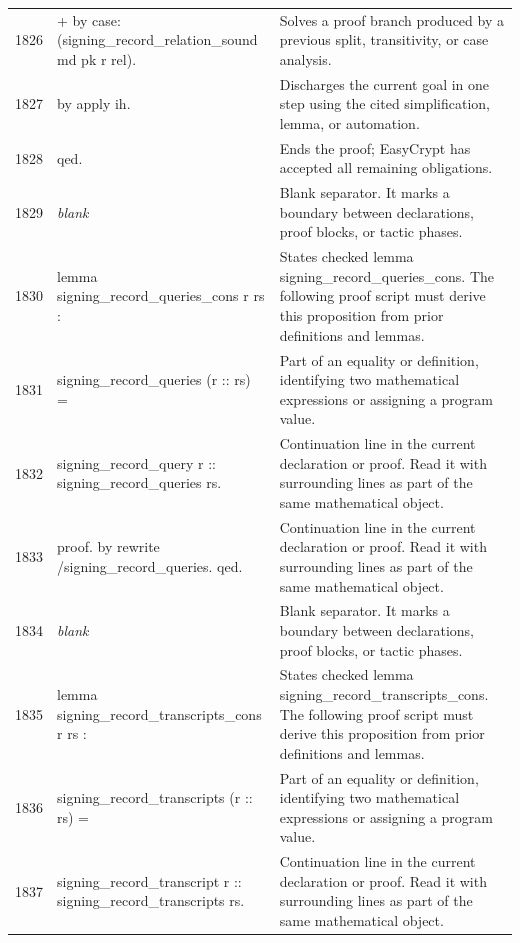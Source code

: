 \documentclass[10pt]{article}
\begin{document}
\begin{longtable}{r L{0.53\textwidth} L{0.37\textwidth}}
1826 & {\ttfamily\scriptsize + by case: (signing\_record\_relation\_sound md pk r rel).} & Solves a proof branch produced by a previous split, transitivity, or case analysis. \\
1827 & {\ttfamily\scriptsize by apply ih.} & Discharges the current goal in one step using the cited simplification, lemma, or automation. \\
1828 & {\ttfamily\scriptsize qed.} & Ends the proof; EasyCrypt has accepted all remaining obligations. \\
1829 & {\ttfamily\scriptsize \emph{blank}} & Blank separator.  It marks a boundary between declarations, proof blocks, or tactic phases. \\
1830 & {\ttfamily\scriptsize lemma signing\_record\_queries\_cons r rs :} & States checked lemma signing\_record\_queries\_cons.  The following proof script must derive this proposition from prior definitions and lemmas. \\
1831 & {\ttfamily\scriptsize   signing\_record\_queries (r :: rs) =} & Part of an equality or definition, identifying two mathematical expressions or assigning a program value. \\
1832 & {\ttfamily\scriptsize   signing\_record\_query r :: signing\_record\_queries rs.} & Continuation line in the current declaration or proof.  Read it with surrounding lines as part of the same mathematical object. \\
1833 & {\ttfamily\scriptsize proof. by rewrite /signing\_record\_queries. qed.} & Continuation line in the current declaration or proof.  Read it with surrounding lines as part of the same mathematical object. \\
1834 & {\ttfamily\scriptsize \emph{blank}} & Blank separator.  It marks a boundary between declarations, proof blocks, or tactic phases. \\
1835 & {\ttfamily\scriptsize lemma signing\_record\_transcripts\_cons r rs :} & States checked lemma signing\_record\_transcripts\_cons.  The following proof script must derive this proposition from prior definitions and lemmas. \\
1836 & {\ttfamily\scriptsize   signing\_record\_transcripts (r :: rs) =} & Part of an equality or definition, identifying two mathematical expressions or assigning a program value. \\
1837 & {\ttfamily\scriptsize   signing\_record\_transcript r :: signing\_record\_transcripts rs.} & Continuation line in the current declaration or proof.  Read it with surrounding lines as part of the same mathematical object. \\

\end{longtable}
\end{document}
